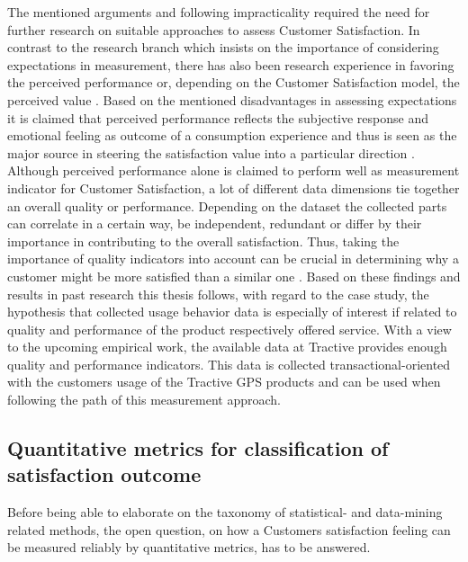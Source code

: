 The mentioned arguments and following impracticality required the need for further research on suitable approaches to assess Customer Satisfaction. In contrast to the research branch which insists on the importance of considering expectations in measurement, there has also been research experience in favoring the perceived performance or, depending on the Customer Satisfaction model, the perceived value \cite{yuksel1998customer}. Based on the mentioned disadvantages in assessing expectations it is claimed that perceived performance reflects the subjective response and emotional feeling as outcome of a consumption experience and thus is seen as the major source in steering the satisfaction value into a particular direction \cite{halstead1994multisource} \cite{cronin1992measuring}. Although perceived performance alone is claimed to perform well as measurement indicator for Customer Satisfaction, a lot of different data dimensions tie together an overall quality or performance. Depending on the dataset the collected parts can correlate in a certain way, be independent, redundant or differ by their importance in contributing to the overall satisfaction. Thus, taking the importance of quality indicators into account can be crucial in determining why a customer might be more satisfied than a similar one \cite{barsky1992customer}. Based on these findings and results in past research this thesis follows, with regard to the case study, the hypothesis that collected usage behavior data is especially of interest if related to quality and performance of the product respectively offered service. With a view to the upcoming empirical work, the available data at Tractive provides enough quality and performance indicators. This data is collected transactional-oriented with the customers usage of the Tractive GPS products and can be used when following the path of this measurement approach. 

\subsection{Quantitative metrics for classification of satisfaction outcome}
Before being able to elaborate on the taxonomy of statistical- and data-mining related methods, the open question, on how a Customers satisfaction feeling can be measured reliably by quantitative metrics, has to be answered. 

